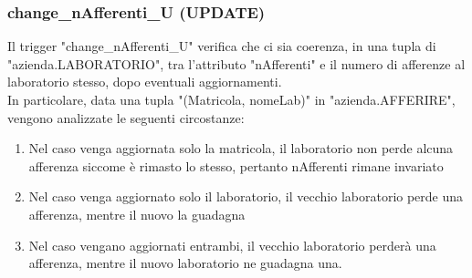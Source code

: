     \subsubsection{change\_nAfferenti\_U (UPDATE)}
    Il trigger "change\_nAfferenti\_U" verifica che ci sia coerenza, in una tupla di "azienda.LABORATORIO", tra l'attributo "nAfferenti" e il numero di afferenze al laboratorio stesso, dopo eventuali aggiornamenti.\\
    In particolare, data una tupla "(Matricola, nomeLab)" in "azienda.AFFERIRE", vengono analizzate le seguenti circostanze:
    \begin{enumerate}
        \item Nel caso venga aggiornata solo la matricola, il laboratorio non perde alcuna afferenza siccome è rimasto lo stesso, pertanto nAfferenti rimane invariato
        \item Nel caso venga aggiornato solo il laboratorio, il vecchio laboratorio perde una afferenza, mentre il nuovo la guadagna
        \item Nel caso vengano aggiornati entrambi, il vecchio laboratorio perderà una afferenza, mentre il nuovo laboratorio ne guadagna una.
    \end{enumerate}

